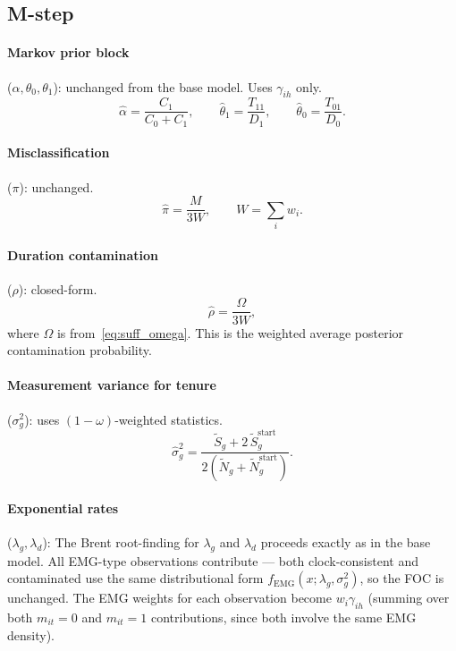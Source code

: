 \documentclass[12pt]{article}
\begin{document}
\subsection{M-step}

\paragraph{Markov prior block} (\(\alpha, \theta_0, \theta_1\)): unchanged from the base model. Uses \(\gamma_{ih}\) only.
\begin{equation}
\hat{\alpha} = \frac{C_1}{C_0 + C_1}, \qquad \hat{\theta}_1 = \frac{T_{11}}{D_1}, \qquad \hat{\theta}_0 = \frac{T_{01}}{D_0}.
\end{equation}

\paragraph{Misclassification} (\(\pi\)): unchanged.
\begin{equation}
\hat{\pi} = \frac{M}{3W}, \qquad W = \sum_i w_i.
\end{equation}

\paragraph{Duration contamination} (\(\rho\)): closed-form.
\begin{equation}
\hat{\rho} = \frac{\Omega}{3W},
\label{eq:mstep_rho}
\end{equation}
where \(\Omega\) is from~\eqref{eq:suff_omega}. This is the weighted average posterior contamination probability.

\paragraph{Measurement variance for tenure} (\(\sigma^2_g\)): uses \((1 - \omega)\)-weighted statistics.
\begin{equation}
\hat{\sigma}^2_g = \frac{\tilde{S}_g + 2\,\tilde{S}^{\mathrm{start}}_g}{2(\tilde{N}_g + \tilde{N}^{\mathrm{start}}_g)}.
\label{eq:mstep_sigma_g_rho}
\end{equation}

\paragraph{Exponential rates} (\(\lambda_g, \lambda_d\)): The Brent root-finding for \(\lambda_g\) and \(\lambda_d\) proceeds exactly as in the base model. All EMG-type observations contribute --- both clock-consistent and contaminated use the same distributional form \(f_{\mathrm{EMG}}(x; \lambda_g, \sigma^2_g)\), so the FOC is unchanged. The EMG weights for each observation become \(w_i \gamma_{ih}\) (summing over both \(m_{it} = 0\) and \(m_{it} = 1\) contributions, since both involve the same EMG density).
\end{document}
